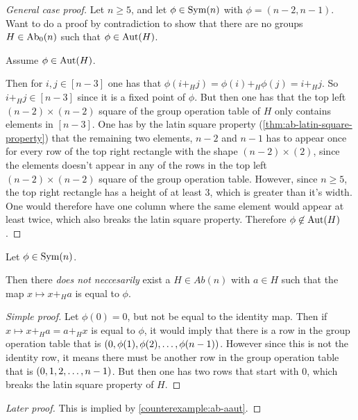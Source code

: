 \begin{proof}[General case proof]
    Let \( n \geq 5 \), and let \( \phi \in \operatorname{Sym}(n) \) with \( \phi = (n-2, n-1) \). Want to do a proof by contradiction to show that there are no groups \( H \in \operatorname{Ab}_0(n) \) such that \( \phi \in \operatorname{Aut}(H) \).

    Assume \( \phi \in \operatorname{Aut}(H) \).

    Then for \( i, j \in [n-3] \) one has that \( \phi(i +_H j) = \phi(i) +_H \phi(j) = i +_H j \). So \( i +_H j \in [n - 3] \) since it is a fixed point of \( \phi \). But then one has that the top left \( (n - 2) \times (n - 2) \) square of the group operation table of \( H \) only contains elements in \( [n-3] \). One has by the latin square property (\autoref{thm:ab-latin-square-property}) that the remaining two elements, \( n - 2 \) and \( n - 1 \) has to appear once for every row of the top right rectangle with the shape \( (n - 2) \times (2) \), since the elements doesn't appear in any of the rows in the top left \( (n - 2) \times (n - 2) \) square of the group operation table. However, since \( n \geq 5 \), the top right rectangle has a height of at least \( 3 \), which is greater than it's width. One would therefore have one column where the same element would appear at least twice, which also breaks the latin square property. Therefore \( \phi \not\in \operatorname{Aut}(H) \).
\end{proof}

\begin{counterexample} \label{counterexample:construction-early-ab-destroy}
    Let \( \phi \in \operatorname{Sym}(n) \).

    Then there \emph{does not neccesarily} exist a \( H \in Ab(n) \) with \( a \in H \) such that the map  \( x \mapsto  x +_H a \) is equal to \( \phi \).
\end{counterexample}
\begin{proof}[Simple proof]
    Let \( \phi(0) = 0 \), but not be equal to the identity map. Then if \( x \mapsto x +_H a = a +_H x \) is equal to \( \phi \), it would imply that there is a row in the group operation table that is  \( \left( 0, \phi(1), \phi(2), \dots, \phi(n-1) \right) \). However since this is not the identity row, it means there must be another row in the group operation table that is \( \left( 0, 1, 2, \dots, n-1 \right) \). But then one has two rows that start with \( 0 \), which breaks the latin square property of \( H \).
\end{proof}
\begin{proof}[Later proof]
    This is implied by \autoref{counterexample:ab-aaut}.
\end{proof}

